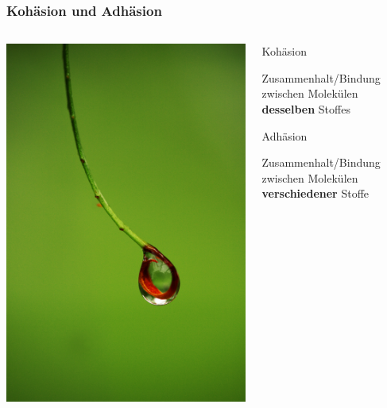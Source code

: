 \documentclass{beamer}
\begin{document}
\begin{frame}
\frametitle{Kohäsion und Adhäsion}

\begin{columns}[c]

\begin{column}{5cm}
\begin{center}
\includegraphics[width=\textwidth]{drop.jpg}
\end{center}

\end{column}

\begin{column}{5cm}

\begin{block}{Kohäsion}

Zusammenhalt/Bindung zwischen Molekülen \textbf{desselben} Stoffes

\end{block}

\begin{block}{Adhäsion}

Zusammenhalt/Bindung zwischen Molekülen \textbf{verschiedener} Stoffe

\end{block}

\end{column}

\end{columns}

\end{frame}
\end{document}
